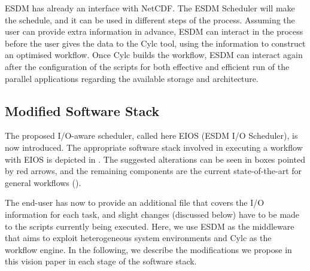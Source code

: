 \documentclass{superfri}
\begin{document}
ESDM has already an interface with NetCDF. The ESDM Scheduler will make the schedule, and it can be used in different steps of the process. Assuming the user can provide extra information in advance, ESDM can interact in the process before the user gives the data to the Cylc tool, using the information to construct an optimised workflow. Once Cylc builds the workflow, ESDM can interact again after the configuration of the scripts for both effective and efficient run of the parallel applications regarding the available storage and architecture.

\subsection{Modified Software Stack}

The proposed I/O-aware scheduler, called here EIOS (ESDM I/O Scheduler), is now introduced.
The appropriate software stack involved in executing a workflow with EIOS is depicted in .
The suggested alterations can be seen in boxes pointed by red arrows, and the remaining components are the current state-of-the-art for general workflows ().

The end-user has now to provide an additional file that covers the I/O information for each task, and slight changes (discussed below) have to be made to the scripts currently being executed.
Here, we use ESDM \cite{esdm} as the middleware that aims to exploit heterogeneous system environments and Cylc \cite{8675433} as the workflow engine.
In the following, we describe the modifications we propose in this vision paper in each stage of the software stack.

\end{document}
